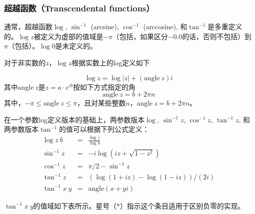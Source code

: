\subsubsection{超越函数（Transcendental functions）}
\label{transcendentalfunctions}

通常，超越函数$\log$, $\sin^{-1}$
(arcsine), $\cos^{-1}$ (arccosine), 和$\tan^{-1}$是多重定义的。$\log z$被定义为虚部的值域是$-\pi$（包括，如果区分$-0.0$的话，否则不包括）到$\pi$（包括）。$\log 0$是未定义的。

对于非实数的$z$，$\log z$根据实数上的log定义如下

\begin{displaymath}
\log z = \log |z| + (\mathrm{angle}~z)i
\end{displaymath}
%
其中$\mathrm{angle}~z$是$z = a\cdot e^{ib}$按如下方式指定的角
$$\mathrm{angle}~z = b+2\pi n$$
其中，$-\pi \leq \mathrm{angle}~z\leq \pi$，且对某些整数$n$，$\mathrm{angle}~z = b+2\pi n$。

在一个参数log定义版本的基础上，两参数版本$\log$, $\sin^{-1} z$, $\cos^{-1} z$,
$\tan^{-1} z$, 和两参数版本$\tan^{-1}$的值可以根据下列公式定义：
\begin{eqnarray*}
\log z~b &=& \frac{\log z}{\log b}\\
\sin^{-1} z &=& -i \log (i z + \sqrt{1 - z^2})\\
\cos^{-1} z &=& \pi / 2 - \sin^{-1} z\\
\tan^{-1} z &=& (\log (1 + i z) - \log (1 - i z)) / (2 i)\\
\tan^{-1} x~y &=& \mathrm{angle}(x+ yi)
\end{eqnarray*}

$\tan^{-1} x~y$的值域如下表所示。星号（*）指示这个条目适用于区别负零的实现。

